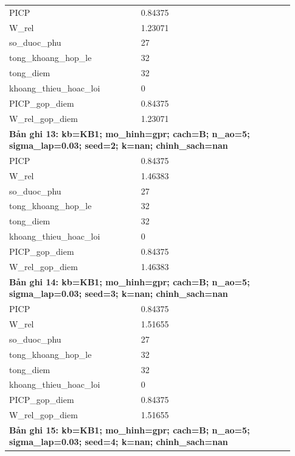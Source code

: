 \begin{longtable}{p{0.43\linewidth}p{0.50\linewidth}}
PICP & 0.84375 \\
W\_\allowbreak rel & 1.23071 \\
so\_\allowbreak duoc\_\allowbreak phu & 27 \\
tong\_\allowbreak khoang\_\allowbreak hop\_\allowbreak le & 32 \\
tong\_\allowbreak diem & 32 \\
khoang\_\allowbreak thieu\_\allowbreak hoac\_\allowbreak loi & 0 \\
PICP\_\allowbreak gop\_\allowbreak diem & 0.84375 \\
W\_\allowbreak rel\_\allowbreak gop\_\allowbreak diem & 1.23071 \\
\midrule
\multicolumn{2}{p{0.95\linewidth}}{\textbf{Bản ghi 13: kb=KB1; mo\_hinh=gpr; cach=B; n\_ao=5; sigma\_lap=0.03; seed=2; k=nan; chinh\_sach=nan}} \\
PICP & 0.84375 \\
W\_\allowbreak rel & 1.46383 \\
so\_\allowbreak duoc\_\allowbreak phu & 27 \\
tong\_\allowbreak khoang\_\allowbreak hop\_\allowbreak le & 32 \\
tong\_\allowbreak diem & 32 \\
khoang\_\allowbreak thieu\_\allowbreak hoac\_\allowbreak loi & 0 \\
PICP\_\allowbreak gop\_\allowbreak diem & 0.84375 \\
W\_\allowbreak rel\_\allowbreak gop\_\allowbreak diem & 1.46383 \\
\midrule
\multicolumn{2}{p{0.95\linewidth}}{\textbf{Bản ghi 14: kb=KB1; mo\_hinh=gpr; cach=B; n\_ao=5; sigma\_lap=0.03; seed=3; k=nan; chinh\_sach=nan}} \\
PICP & 0.84375 \\
W\_\allowbreak rel & 1.51655 \\
so\_\allowbreak duoc\_\allowbreak phu & 27 \\
tong\_\allowbreak khoang\_\allowbreak hop\_\allowbreak le & 32 \\
tong\_\allowbreak diem & 32 \\
khoang\_\allowbreak thieu\_\allowbreak hoac\_\allowbreak loi & 0 \\
PICP\_\allowbreak gop\_\allowbreak diem & 0.84375 \\
W\_\allowbreak rel\_\allowbreak gop\_\allowbreak diem & 1.51655 \\
\midrule
\multicolumn{2}{p{0.95\linewidth}}{\textbf{Bản ghi 15: kb=KB1; mo\_hinh=gpr; cach=B; n\_ao=5; sigma\_lap=0.03; seed=4; k=nan; chinh\_sach=nan}} \\

\end{longtable}
